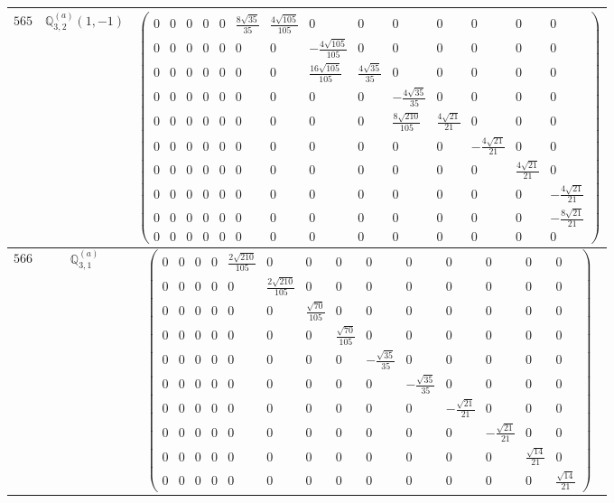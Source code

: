 \documentclass[fleqn,8pt,landscape]{jsarticle}
\begin{document}
\begin{center}
\begin{longtable}{ccc}
$ 565 $ & $ \mathbb{Q}_{3,2}^{(a)}(1,-1) $ & $ \begin{pmatrix} 0 & 0 & 0 & 0 & 0 & \frac{8 \sqrt{35}}{35} & \frac{4 \sqrt{105}}{105} & 0 & 0 & 0 & 0 & 0 & 0 & 0 \\ 0 & 0 & 0 & 0 & 0 & 0 & 0 & - \frac{4 \sqrt{105}}{105} & 0 & 0 & 0 & 0 & 0 & 0 \\ 0 & 0 & 0 & 0 & 0 & 0 & 0 & \frac{16 \sqrt{105}}{105} & \frac{4 \sqrt{35}}{35} & 0 & 0 & 0 & 0 & 0 \\ 0 & 0 & 0 & 0 & 0 & 0 & 0 & 0 & 0 & - \frac{4 \sqrt{35}}{35} & 0 & 0 & 0 & 0 \\ 0 & 0 & 0 & 0 & 0 & 0 & 0 & 0 & 0 & \frac{8 \sqrt{210}}{105} & \frac{4 \sqrt{21}}{21} & 0 & 0 & 0 \\ 0 & 0 & 0 & 0 & 0 & 0 & 0 & 0 & 0 & 0 & 0 & - \frac{4 \sqrt{21}}{21} & 0 & 0 \\ 0 & 0 & 0 & 0 & 0 & 0 & 0 & 0 & 0 & 0 & 0 & 0 & \frac{4 \sqrt{21}}{21} & 0 \\ 0 & 0 & 0 & 0 & 0 & 0 & 0 & 0 & 0 & 0 & 0 & 0 & 0 & - \frac{4 \sqrt{21}}{21} \\ 0 & 0 & 0 & 0 & 0 & 0 & 0 & 0 & 0 & 0 & 0 & 0 & 0 & - \frac{8 \sqrt{21}}{21} \\ 0 & 0 & 0 & 0 & 0 & 0 & 0 & 0 & 0 & 0 & 0 & 0 & 0 & 0 \end{pmatrix} $ \\ \hline
$ 566 $ & $ \mathbb{Q}_{3,1}^{(a)} $ & $ \begin{pmatrix} 0 & 0 & 0 & 0 & \frac{2 \sqrt{210}}{105} & 0 & 0 & 0 & 0 & 0 & 0 & 0 & 0 & 0 \\ 0 & 0 & 0 & 0 & 0 & \frac{2 \sqrt{210}}{105} & 0 & 0 & 0 & 0 & 0 & 0 & 0 & 0 \\ 0 & 0 & 0 & 0 & 0 & 0 & \frac{\sqrt{70}}{105} & 0 & 0 & 0 & 0 & 0 & 0 & 0 \\ 0 & 0 & 0 & 0 & 0 & 0 & 0 & \frac{\sqrt{70}}{105} & 0 & 0 & 0 & 0 & 0 & 0 \\ 0 & 0 & 0 & 0 & 0 & 0 & 0 & 0 & - \frac{\sqrt{35}}{35} & 0 & 0 & 0 & 0 & 0 \\ 0 & 0 & 0 & 0 & 0 & 0 & 0 & 0 & 0 & - \frac{\sqrt{35}}{35} & 0 & 0 & 0 & 0 \\ 0 & 0 & 0 & 0 & 0 & 0 & 0 & 0 & 0 & 0 & - \frac{\sqrt{21}}{21} & 0 & 0 & 0 \\ 0 & 0 & 0 & 0 & 0 & 0 & 0 & 0 & 0 & 0 & 0 & - \frac{\sqrt{21}}{21} & 0 & 0 \\ 0 & 0 & 0 & 0 & 0 & 0 & 0 & 0 & 0 & 0 & 0 & 0 & \frac{\sqrt{14}}{21} & 0 \\ 0 & 0 & 0 & 0 & 0 & 0 & 0 & 0 & 0 & 0 & 0 & 0 & 0 & \frac{\sqrt{14}}{21} \end{pmatrix} $ \\ \hline

\end{longtable}
\end{center}
\end{document}
